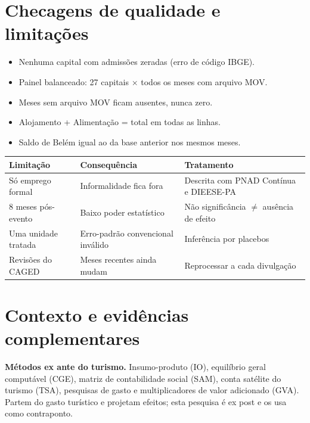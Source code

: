 \documentclass[11pt,a4paper]{article}
\begin{document}
\section{Checagens de qualidade e limitações}

\begin{itemize}[label=$\square$]
  \item Nenhuma capital com admissões zeradas (erro de código IBGE).
  \item Painel balanceado: 27 capitais $\times$ todos os meses com arquivo MOV.
  \item Meses sem arquivo MOV ficam ausentes, nunca zero.
  \item Alojamento + Alimentação = total em todas as linhas.
  \item Saldo de Belém igual ao da base anterior nos mesmos meses.
\end{itemize}

\begin{table}[H]
\centering\small
\begin{tabularx}{\linewidth}{p{3.2cm}LL}
\toprule
\textbf{Limitação} & \textbf{Consequência} & \textbf{Tratamento}\\
\midrule
Só emprego formal & Informalidade fica fora & Descrita com PNAD Contínua e DIEESE-PA\\
8 meses pós-evento & Baixo poder estatístico & Não significância $\neq$ ausência de efeito\\
Uma unidade tratada & Erro-padrão convencional inválido & Inferência por placebos\\
Revisões do CAGED & Meses recentes ainda mudam & Reprocessar a cada divulgação\\
\bottomrule
\end{tabularx}
\end{table}

\section{Contexto e evidências complementares}

\textbf{Métodos ex ante do turismo.} Insumo-produto (IO), equilíbrio geral computável (CGE), matriz de
contabilidade social (SAM), conta satélite do turismo (TSA), pesquisas de gasto e multiplicadores de
valor adicionado (GVA). Partem do gasto turístico e projetam efeitos; esta pesquisa é ex post e os usa
como contraponto.
\end{document}
